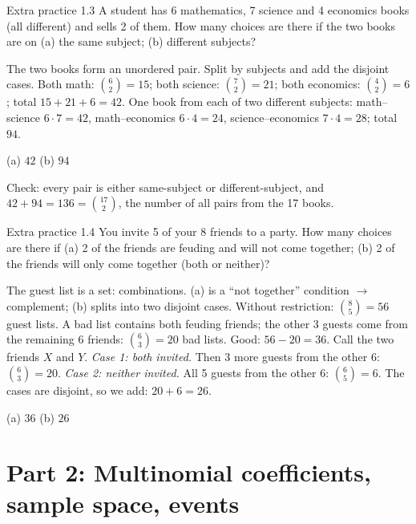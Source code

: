 \begin{task}{Extra practice 1.3}
	A student has 6 mathematics, 7 science and 4 economics books (all
	different) and sells 2 of them. How many choices are there if the two books
	are on (a) the same subject; (b) different subjects?
\end{task}
\workspace{2.5cm}

\ifsolutions
	\soltitle
	\idea The two books form an unordered pair. Split by subjects and add the
	disjoint cases.
	 Both math: $\binom62=15$; both science: $\binom72=21$; both
	economics: $\binom42=6$; total $15+21+6=42$.
	 One book from each of two different subjects:
	math--science $6\cdot7=42$, math--economics $6\cdot4=24$,
	science--economics $7\cdot4=28$; total $94$.
	\begin{answer}
		(a) $42$ \qquad (b) $94$
	\end{answer}
	\begin{remark}
		Check: every pair is either same-subject or different-subject, and
		$42+94=136=\binom{17}{2}$, the number of all pairs from the 17 books.
	\end{remark}
\fi

\begin{task}{Extra practice 1.4}
	You invite 5 of your 8 friends to a party. How many choices are there if
	(a) 2 of the friends are feuding and will not come together; (b) 2 of the
	friends will only come together (both or neither)?
\end{task}
\workspace{2.5cm}

\ifsolutions
	\soltitle
	\idea The guest list is a set: combinations. (a) is a ``not together''
	condition $\to$ complement; (b) splits into two disjoint cases.
	 Without restriction: $\binom85=56$ guest lists. A bad list
	contains both feuding friends; the other 3 guests come from the remaining
	6 friends: $\binom63=20$ bad lists. Good: $56-20=36$.
	 Call the two friends $X$ and $Y$. \emph{Case 1: both invited.}
	Then 3 more guests from the other 6: $\binom63=20$. \emph{Case 2: neither
		invited.} All 5 guests from the other 6: $\binom65=6$. The cases are
	disjoint, so we add: $20+6=26$.
	\begin{answer}
		(a) $36$ \qquad (b) $26$
	\end{answer}
\fi

\clearpage
\section{Part 2: Multinomial coefficients, sample space, events}

